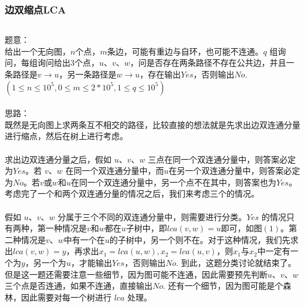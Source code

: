 \documentclass[twoside]{article}
\begin{document}
\subsubsection{边双缩点LCA}
\begin{lstlisting}
\end{lstlisting}
题意：\\
\quad 给出一个无向图，$n$个点，$m$条边，可能有重边与自环，也可能不连通。$q$ 组询问，每组询问给出$3$个点，$u$、$v$、$w$，问是否存在两条路径不存在公共边，并且一条路径是$v\rightarrow u$，另一条路径是$w\rightarrow u$，存在输出$Yes$，否则输出$No$. $(1\leq n \leq 10^5,0\leq m\leq 2*10^5,1\leq q\leq 10^5)$\\
\\
思路：\\
\quad 既然是无向图上求两条互不相交的路径，比较直接的想法就是先求出边双连通分量进行缩点，然后在树上进行考虑。\\
\\
\quad 求出边双连通分量之后，假如 $u$、$v$、$w$ 三点在同一个双连通分量中，则答案必定为$Yes$。若 $v$、$w$ 在同一个双连通分量中，而$u$在另一个双连通分量中，则答案必定为$No$。若$v$或$w$和$u$在同一个双连通分量中，另一个点不在其中，则答案也为$Yes$。考虑完了一个和两个双连通分量的情况之后，我们来考虑三个的情况。\\
\\
\quad 假如 $u$、$v$、$w$ 分属于三个不同的双连通分量中，则需要进行分类。$Yes$ 的情况只有两种，第一种情况是$v$和$w$都在$u$子树中，即$lca(v,w) = u$即可，如图$(1)$。第二种情况是$v$、$w$中有一个在$u$的子树中，另一个则不在。对于这种情况，我们先求出$lca(v,w) = y$，再求出$x_1 = lca(u,w),x_2=lca(u,v)$，则$x_1$与$x_2$中一定有一个为$y$，另一个为$u$，才能输出$Yes$，否则输出$No$. 到此，这题分类讨论就结束了。\\
\quad 但是这一题还需要注意一些细节，因为图可能不连通，因此需要预先判断$u$、$v$、$w$三个点是否连通，如果不连通，直接输出$No$. 还有一个细节，因为图可能是个森林，因此需要对每一个树进行 $lca$ 处理。\\
\end{document}
